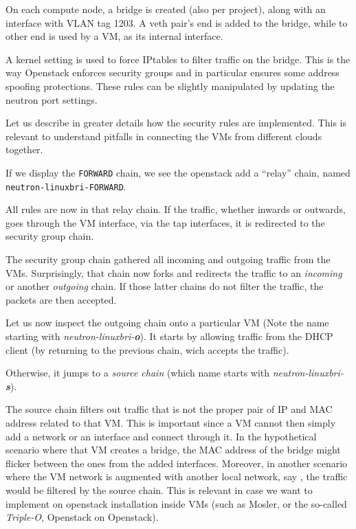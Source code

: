 On each compute node, a bridge is created (also per project), along
with an interface with VLAN tag 1203. A veth pair's end is added to
the bridge, while to other end is used by a VM, as its internal
interface.

A kernel setting is used to force IPtables to filter traffic on the
bridge. This is the way Openstack enforces security groups and in
particular ensures some address spoofing protections. These rules can
be slightly manipulated by updating the neutron port settings.



Let us describe in greater details how the security rules are
implemented. This is relevant to understand pitfalls in connecting the
VMs from different clouds together.

If we display the \texttt{FORWARD} chain, we see the openstack add a
``relay'' chain, named \texttt{neutron-linuxbri-FORWARD}.


All rules are now in that relay chain. If the traffic, whether inwards
or outwards, goes through the VM interface, via the tap interfaces, it
is redirected to the security group chain.


The security group chain gathered all incoming and outgoing traffic
from the VMs. Surprisingly, that chain now forks and redirects the
traffic to an \emph{incoming} or another \emph{outgoing} chain. If
those latter chains do not filter the traffic, the packets are then
accepted.


Let us now inspect the outgoing chain onto a particular VM (Note the
name starting with \emph{neutron-linuxbri-\textbf{o}}). It starts by
allowing traffic from the DHCP client (by returning to the previous
chain, wich accepts the traffic).


Otherwise, it jumps to a \emph{source chain} (which name starts with \emph{neutron-linuxbri-\textbf{s}}).


The source chain filters out traffic that is not the proper pair of IP
and MAC address related to that VM. This is important since a VM
cannot then simply add a network or an interface and connect through
it. In the hypothetical scenario where that VM creates a bridge, the
MAC address of the bridge might flicker between the ones from the
added interfaces. Moreover, in another scenario where the VM network
is augmented with another local network, say , the
traffic would be filtered by the source chain. This is relevant in
case we want to implement on openstack installation inside VMs (such
as Mosler, or the so-called \emph{Triple-O}, Openstack on Openstack).

